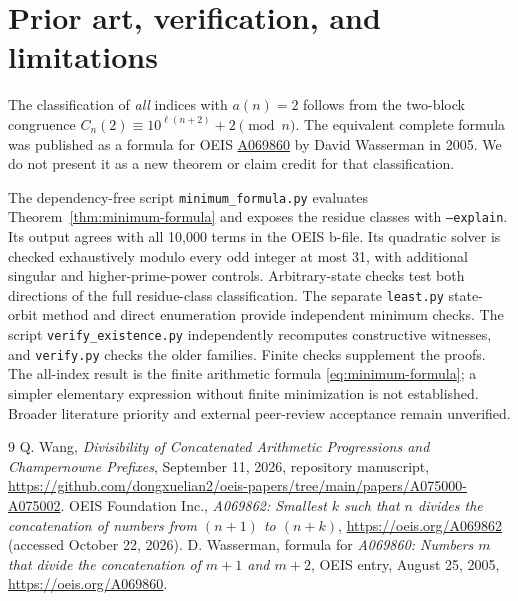 \documentclass[10pt]{article}
\begin{document}
\section{Prior art, verification, and limitations}
The classification of \emph{all} indices with $a(n)=2$ follows from the two-block congruence $C_n(2)\equiv10^{\ell(n+2)}+2\pmod n$. The equivalent complete formula was published as a formula for OEIS \href{https://oeis.org/A069860}{A069860} by David Wasserman in 2005. We do not present it as a new theorem or claim credit for that classification.

The dependency-free script \texttt{minimum\_formula.py} evaluates
Theorem~\ref{thm:minimum-formula} and exposes the residue classes with
\texttt{--explain}. Its output agrees with all 10,000 terms in the OEIS
b-file. Its quadratic solver is checked exhaustively modulo every odd
integer at most 31, with additional singular and higher-prime-power
controls. Arbitrary-state checks test both directions of the full
residue-class classification. The separate \texttt{least.py} state-orbit
method and direct enumeration provide independent minimum checks.
The script \texttt{verify\_existence.py} independently recomputes
constructive witnesses, and \texttt{verify.py} checks the older families.
Finite checks supplement the proofs. The all-index result is the finite
arithmetic formula \eqref{eq:minimum-formula}; a simpler elementary
expression without finite minimization is not established. Broader
literature priority and external peer-review acceptance remain unverified.
\begin{thebibliography}{9}
 Q. Wang, \emph{Divisibility of Concatenated Arithmetic Progressions and Champernowne Prefixes}, September 11, 2026, repository manuscript, \url{https://github.com/dongxuelian2/oeis-papers/tree/main/papers/A075000-A075002}.
 OEIS Foundation Inc., \emph{A069862: Smallest $k$ such that $n$ divides the concatenation of numbers from $(n+1)$ to $(n+k)$}, \url{https://oeis.org/A069862} (accessed October 22, 2026).
 D. Wasserman, formula for \emph{A069860: Numbers $m$ that divide the concatenation of $m+1$ and $m+2$}, OEIS entry, August 25, 2005, \url{https://oeis.org/A069860}.
\end{thebibliography}
\end{document}
